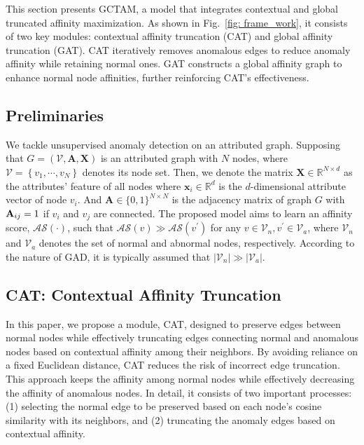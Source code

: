 \documentclass{article}
\begin{document}
This section presents GCTAM, a model that integrates contextual and global truncated affinity maximization. As shown in Fig.~\ref{fig: frame_work}, it consists of two key modules: contextual affinity truncation (CAT) and global affinity truncation (GAT). CAT iteratively removes anomalous edges to reduce anomaly affinity while retaining normal ones. GAT constructs a global affinity graph to enhance normal node affinities, further reinforcing CAT’s effectiveness.





\subsection{Preliminaries}

We tackle unsupervised anomaly detection on an attributed graph. 
Supposing that $G=(\mathcal{V}, \mathbf{A},  \mathbf{X})$ is an attributed graph with $N$ nodes, where $ \mathcal{V} = \left\{v_1, \cdots, v_N\right\}$ denotes its node set. 
Then, we denote the matrix $\mathbf{X} \in \mathbb{R}^{N \times d}$ as the attributes' feature of all nodes where $\mathbf{x}_i \in \mathbb{R}^d$ is the $d$-dimensional attribute vector of node $v_i$.
And $\mathbf{A} \in\{0,1\}^{N \times N}$ is the adjacency matrix of graph $G$ with ${{\bf{A}}_{ij} = 1}$ if $v_i$ and $v_j$ are connected. The proposed model aims to learn an affinity score, $\mathcal{AS}(\cdot)$, such that $\mathcal{AS}(v) \gg \mathcal{AS}(v^{\prime})$ for any $v\in \mathcal{V}_{n}, v^{\prime} \in \mathcal{V}_{a}$, where ${{\mathcal V}_n}$ and ${\mathcal V}_{a}$ denotes the set of normal and abnormal nodes, respectively. According to the nature of GAD, it is typically assumed that $\left| {\mathcal V}_n \right| \gg \left| {\mathcal V}_{a} \right|$.  


\subsection{CAT: Contextual Affinity Truncation}
In this paper, we propose a module, CAT, designed to preserve edges between normal nodes while effectively truncating edges connecting normal and anomalous nodes based on contextual affinity among their neighbors. 
By avoiding reliance on a fixed Euclidean distance, CAT reduces the risk of incorrect edge truncation. This approach keeps the affinity among normal nodes while effectively decreasing the affinity of anomalous nodes.
In detail, it consists of two important processes: (1) selecting the normal edge to be preserved based on each node's cosine similarity with its neighbors, and (2) truncating the anomaly edges based on contextual affinity.
\end{document}
